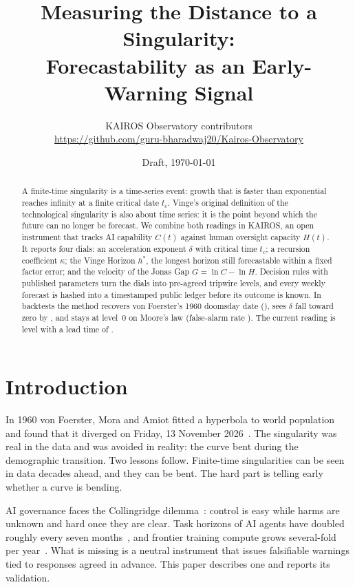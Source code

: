 \documentclass[11pt]{article}
\title{Measuring the Distance to a Singularity:\\
Forecastability as an Early-Warning Signal}
\author{KAIROS Observatory contributors\\
\small\url{https://github.com/guru-bharadwaj20/Kairos-Observatory}}
\date{Draft, \today}
\begin{document}
\maketitle

\begin{abstract}
A finite-time singularity is a time-series event: growth that is faster than
exponential reaches infinity at a finite critical date $t_c$. Vinge's original
definition of the technological singularity is also about time series: it is the
point beyond which the future can no longer be forecast. We combine both
readings in KAIROS, an open instrument that tracks AI capability $C(t)$ against
human oversight capacity $H(t)$. It reports four dials: an acceleration
exponent $\delta$ with critical time $t_c$; a recursion coefficient $\kappa$;
the Vinge Horizon $h^*$, the longest horizon still forecastable within a fixed
factor error; and the velocity of the Jonas Gap $G=\ln C-\ln H$. Decision rules
with published parameters turn the dials into pre-agreed tripwire levels, and
every weekly forecast is hashed into a timestamped public ledger before its
outcome is known. In backtests the method recovers von Foerster's 1960
doomsday date (\resPopTc), sees $\delta$ fall toward zero by \resPopBendYear,
and stays at level~0 on Moore's law (false-alarm rate \resMooreFAR). The
current reading is level \resLevel{} with a lead time of \resLeadTime.
\end{abstract}

\section{Introduction}

In 1960 von Foerster, Mora and Amiot fitted a hyperbola to world population and
found that it diverged on Friday, 13 November 2026~\cite{vonfoerster1960}.
The singularity was real in the data and was avoided in reality: the curve bent
during the demographic transition. Two lessons follow. Finite-time
singularities can be seen in data decades ahead, and they can be bent. The hard
part is telling early whether a curve is bending.

AI governance faces the Collingridge dilemma~\cite{collingridge1980}: control is
easy while harms are unknown and hard once they are clear. Task horizons of AI
agents have doubled roughly every seven months~\cite{metr2025}, and frontier
training compute grows several-fold per year~\cite{epoch}. What is missing is a
neutral instrument that issues falsifiable warnings tied to responses agreed in
advance. This paper describes one and reports its validation.
\end{document}
